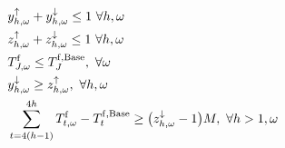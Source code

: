{\begin{subequations}
\begin{align}
        \                                                                                             & y_{h,\omega}^{\uparrow} + y_{h,\omega}^{\downarrow} \leq 1 \                                                           \forall{h,\omega}                                                                                                                                                                     \label{aux:6}                                              \\
        \                                                                                             & z_{h,\omega}^{\uparrow} + z_{h,\omega}^{\downarrow} \leq 1 \                                                           \forall{h,\omega} \label{aux:7}                                                                                                                                                                                                                  \\
        \                                                                                             & T^{\rm{f}}_{J,\omega} \leq T^{\rm{f}, \rm{Base}}_{J}, \ \forall{\omega} \label{temp:1}                                                                                                                                                                                                                                                                                     \\
        \                                                                                             & y^{\downarrow}_{h, \omega} \geq z^{\uparrow}_{h, \omega}, \                                                                                                                                                                                                                                                                 \forall{h, \omega} \label{rebound:1}        \\
        \                                                                                             & \sum_{t=4(h-1)}^{4 h} T^{\rm{f}}_{t, \omega} - T^{\rm{f}, \rm{Base}}_{t} \geq \big( z^{\downarrow}_{h, \omega} -1\big)  M,  \  \forall{h>1,\omega} \label{rebound:3}                                                                                                                                                                                 \\

\end{align}
\end{subequations}}
